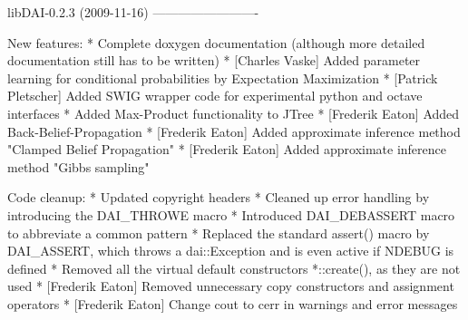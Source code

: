 \begin{DoxyVerbInclude}
libDAI-0.2.3 (2009-11-16)
-------------------------

New features:
* Complete doxygen documentation (although more detailed documentation still
  has to be written)
* [Charles Vaske] Added parameter learning for conditional probabilities by 
  Expectation Maximization
* [Patrick Pletscher] Added SWIG wrapper code for experimental python and 
  octave interfaces
* Added Max-Product functionality to JTree
* [Frederik Eaton] Added Back-Belief-Propagation
* [Frederik Eaton] Added approximate inference method "Clamped Belief Propagation"
* [Frederik Eaton] Added approximate inference method "Gibbs sampling"

Code cleanup:
* Updated copyright headers
* Cleaned up error handling by introducing the DAI_THROWE macro
* Introduced DAI_DEBASSERT macro to abbreviate a common pattern
* Replaced the standard assert() macro by DAI_ASSERT, which throws a
  dai::Exception and is even active if NDEBUG is defined
* Removed all the virtual default constructors *::create(), as they are not used
* [Frederik Eaton] Removed unnecessary copy constructors and assignment operators
* [Frederik Eaton] Change cout to cerr in warnings and error messages


\end{DoxyVerbInclude}
